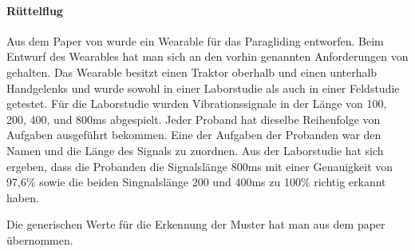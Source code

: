 

\paragraph{Rüttelflug}

Aus dem Paper von \cite{pescara2016ruttelflug} wurde ein Wearable für das Paragliding entworfen.
Beim Entwurf des Wearables hat man sich an den vorhin genannten Anforderungen von \cite{gemperle2001design} gehalten.
Das Wearable besitzt einen Traktor oberhalb und einen unterhalb Handgelenks und wurde sowohl in einer Laborstudie als auch in einer Feldstudie getestet.
Für die Laborstudie wurden Vibrationssignale in der Länge von 100, 200, 400, und 800ms abgespielt. 
Jeder Proband hat dieselbe Reihenfolge von Aufgaben ausgeführt bekommen. 
Eine der Aufgaben der Probanden war den Namen und die Länge des Signals zu zuordnen. 
Aus der Laborstudie hat sich ergeben, dass die Probanden die Signalslänge 800ms mit einer Genauigkeit von 97,6\% sowie die beiden Singnalslänge 200 und 400ms zu 100\% richtig erkannt haben. 

Die generischen Werte für die Erkennung der Muster hat man aus dem paper übernommen.